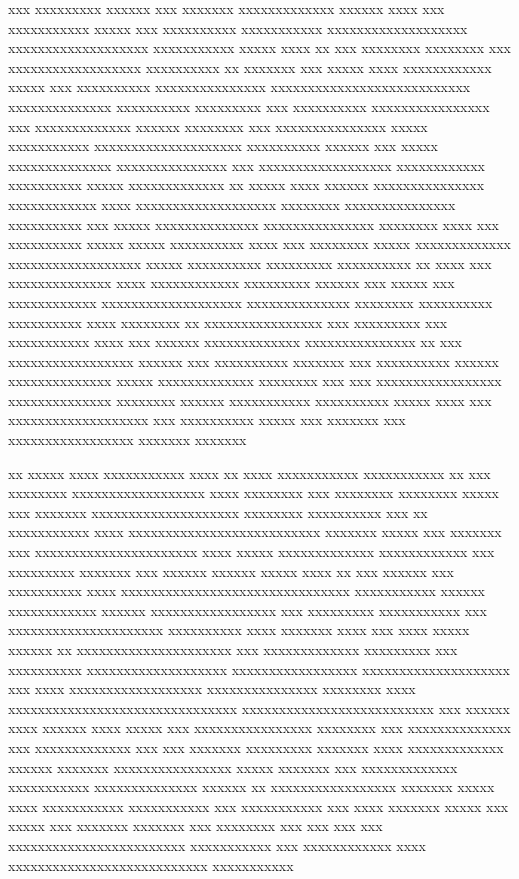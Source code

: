 \begin{introduction}
xxx xxxxxxxxx xxxxxx xxx xxxxxxx xxxxxxxxxxxxx xxxxxx xxxx xxx xxxxxxxxxxx xxxxx xxx xxxxxxxxxx xxxxxxxxxxx xxxxxxxxxxxxxxxxxxx xxxxxxxxxxxxxxxxxxx xxxxxxxxxxx xxxxx xxxx xx xxx xxxxxxxx xxxxxxxx xxx xxxxxxxxxxxxxxxxxx xxxxxxxxxx xx xxxxxxx xxx xxxxx xxxx xxxxxxxxxxxx xxxxx xxx xxxxxxxxxx xxxxxxxxxxxxxxx xxxxxxxxxxxxxxxxxxxxxxxxxxx xxxxxxxxxxxxxx xxxxxxxxxx xxxxxxxxx xxx xxxxxxxxxx xxxxxxxxxxxxxxxx xxx xxxxxxxxxxxxx xxxxxx xxxxxxxx xxx xxxxxxxxxxxxxxx xxxxx xxxxxxxxxxx xxxxxxxxxxxxxxxxxxxx xxxxxxxxxx xxxxxx xxx xxxxx xxxxxxxxxxxxxx xxxxxxxxxxxxxxx xxx xxxxxxxxxxxxxxxxxx xxxxxxxxxxxx xxxxxxxxxx xxxxx xxxxxxxxxxxxx xx xxxxx xxxx xxxxxx xxxxxxxxxxxxxxx xxxxxxxxxxxx xxxx xxxxxxxxxxxxxxxxxxx xxxxxxxx xxxxxxxxxxxxxxx xxxxxxxxxx xxx xxxxx xxxxxxxxxxxxxx xxxxxxxxxxxxxxx xxxxxxxx xxxx xxx xxxxxxxxxx xxxxx xxxxx xxxxxxxxxx xxxx xxx xxxxxxxx xxxxx xxxxxxxxxxxxx xxxxxxxxxxxxxxxxxx xxxxx xxxxxxxxxx xxxxxxxxx xxxxxxxxxx xx xxxx xxx xxxxxxxxxxxxxx xxxx xxxxxxxxxxxx xxxxxxxxx xxxxxx xxx xxxxx xxx xxxxxxxxxxxx xxxxxxxxxxxxxxxxxxx xxxxxxxxxxxxxx xxxxxxxx xxxxxxxxxx xxxxxxxxxx xxxx xxxxxxxx xx xxxxxxxxxxxxxxxx xxx xxxxxxxxx xxx xxxxxxxxxxx xxxx xxx xxxxxx xxxxxxxxxxxxx xxxxxxxxxxxxxxx xx xxx xxxxxxxxxxxxxxxxx xxxxxx xxx xxxxxxxxxx xxxxxxx xxx xxxxxxxxxx xxxxxx xxxxxxxxxxxxxx xxxxx xxxxxxxxxxxxx xxxxxxxx xxx xxx xxxxxxxxxxxxxxxxx xxxxxxxxxxxxxx xxxxxxxx xxxxxx xxxxxxxxxxx xxxxxxxxxx xxxxx xxxx xxx xxxxxxxxxxxxxxxxxxx xxx xxxxxxxxxx xxxxx xxx xxxxxxx xxx xxxxxxxxxxxxxxxxx xxxxxxx xxxxxxx

xx xxxxx xxxx xxxxxxxxxxx xxxx xx xxxx xxxxxxxxxxx xxxxxxxxxxx xx xxx xxxxxxxx xxxxxxxxxxxxxxxxxx xxxx xxxxxxxx xxx xxxxxxxx xxxxxxxx xxxxx xxx xxxxxxx xxxxxxxxxxxxxxxxxxxx xxxxxxxx xxxxxxxxxx xxx xx xxxxxxxxxxx xxxx xxxxxxxxxxxxxxxxxxxxxxxxxx xxxxxxx xxxxx xxx xxxxxxx xxx xxxxxxxxxxxxxxxxxxxxxx xxxx xxxxx xxxxxxxxxxxxx xxxxxxxxxxxx xxx xxxxxxxxx xxxxxxx xxx xxxxxx xxxxxx xxxxx xxxx xx xxx xxxxxx xxx xxxxxxxxxx xxxx xxxxxxxxxxxxxxxxxxxxxxxxxxxxxxx xxxxxxxxxxx xxxxxx xxxxxxxxxxxx xxxxxx xxxxxxxxxxxxxxxxx xxx xxxxxxxxx xxxxxxxxxxx xxx xxxxxxxxxxxxxxxxxxxxx xxxxxxxxxx xxxx xxxxxxx xxxx xxx xxxx xxxxx xxxxxx xx xxxxxxxxxxxxxxxxxxxxx xxx xxxxxxxxxxxxx xxxxxxxxx xxx xxxxxxxxxx xxxxxxxxxxxxxxxxxxx xxxxxxxxxxxxxxxxx xxxxxxxxxxxxxxxxxxxx xxx xxxx xxxxxxxxxxxxxxxxxx xxxxxxxxxxxxxxx xxxxxxxx xxxx xxxxxxxxxxxxxxxxxxxxxxxxxxxxxxx xxxxxxxxxxxxxxxxxxxxxxxxxx xxx xxxxxx xxxx xxxxxx xxxx xxxxx xxx xxxxxxxxxxxxxxxx xxxxxxxx xxx xxxxxxxxxxxxxx xxx xxxxxxxxxxxxx xxx xxx xxxxxxx xxxxxxxxx xxxxxxx xxxx xxxxxxxxxxxxx xxxxxx xxxxxxx xxxxxxxxxxxxxxxx xxxxx xxxxxxx xxx xxxxxxxxxxxxx xxxxxxxxxxx xxxxxxxxxxxxxx xxxxxx xx xxxxxxxxxxxxxxxxx xxxxxxx xxxxx xxxx xxxxxxxxxxx xxxxxxxxxxx xxx xxxxxxxxxxx xxx xxxx xxxxxxx xxxxx xxx xxxxx xxx xxxxxxx xxxxxxx xxx xxxxxxxx xxx xxx xxx xxx xxxxxxxxxxxxxxxxxxxxxxxx xxxxxxxxxxx xxx xxxxxxxxxxxx xxxx xxxxxxxxxxxxxxxxxxxxxxxxxxx xxxxxxxxxxx


\end{introduction}
